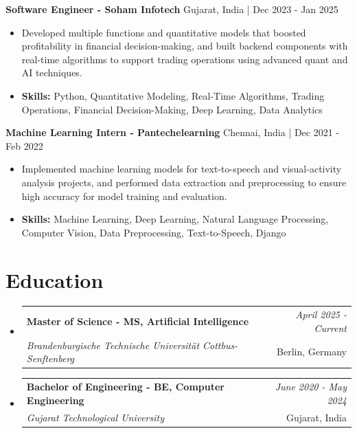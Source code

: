 \documentclass[a4paper,11pt]{article}
\makeatletter
\newcommand{\resumeSubheading}[4]{
\vspace{0.5mm}\item
    \begin{tabular*}{\linewidth}[t]{l@{\extracolsep{\fill}}r}
        \textbf{#1} & \textit{\footnotesize{#4}} \\
        \textit{\footnotesize{#3}} &  \footnotesize{#2}\\
    \end{tabular*}
    \vspace{-2.4mm}
}
\makeatother
\begin{document}
\vspace{1mm}
  \textbf{Software Engineer - Soham Infotech} \hfill Gujarat, India | Dec 2023 - Jan 2025
\vspace{-1.5mm} %
\begin{itemize}
  \item Developed multiple functions and quantitative models that boosted profitability in financial decision-making, and built backend components with real-time algorithms to support trading operations using advanced quant and AI techniques.

\vspace{-2mm}
  \item \textbf{Skills:} Python, Quantitative Modeling, Real-Time Algorithms, Trading Operations, Financial Decision-Making, Deep Learning, Data Analytics
\end{itemize}

\vspace{1mm}
  \textbf{Machine Learning Intern - Pantechelearning} \hfill Chennai, India | Dec 2021 - Feb 2022
\vspace{-1.5mm} %
\begin{itemize}
  \item Implemented machine learning models for text-to-speech and visual-activity analysis projects, and performed data extraction and preprocessing to ensure high accuracy for model training and evaluation.
\vspace{-2mm}
  \item \textbf{Skills:} Machine Learning, Deep Learning, Natural Language Processing, Computer Vision, Data Preprocessing, Text-to-Speech, Django
\end{itemize}\section{\textbf{Education}}
\vspace{-0.4mm}

\begin{itemize}[leftmargin=0.15in, label={}]
\resumeSubheading
{Master of Science - MS, Artificial Intelligence }{Berlin, Germany}
{Brandenburgische Technische Universität Cottbus-Senftenberg  }{April 2025 - Current}

\vspace{1.0mm} %
\resumeSubheading
{Bachelor of Engineering - BE, Computer Engineering  }{Gujarat, India}
{Gujarat Technological University }{June 2020 - May 2024}

\end{itemize}
\end{document}
